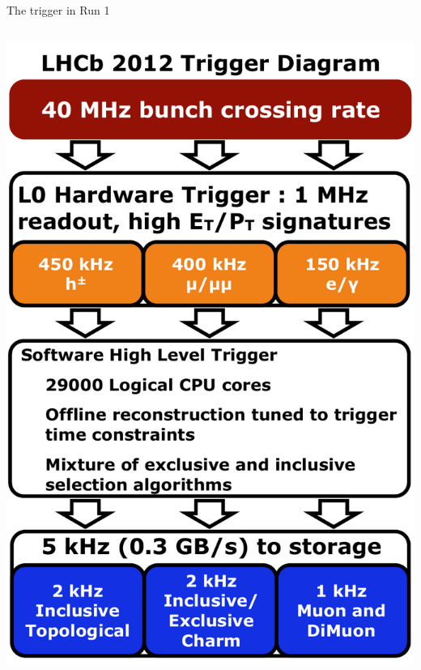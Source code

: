 \documentclass[aspectratio=1610]{beamer}
\begin{document}
\begin{frame}{The \lhcb trigger in Run 1}
\begin{columns}
\begin{column}{0.3\textwidth}
\includegraphics[width=\textwidth]{figs/detector/trigger-run1.pdf}
\end{column}
\end{columns}

\end{frame}
\end{document}
